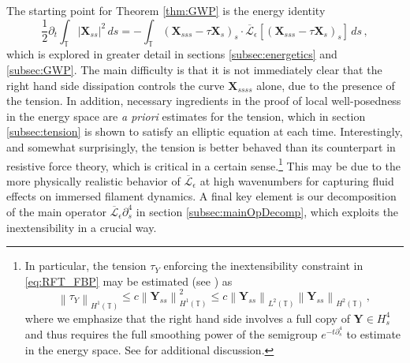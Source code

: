 \documentclass[11pt,reqno]{amsart}
\newcommand{\T}{\mathbb{T}}
\newcommand{\X}{\bm{X}}
\newcommand{\Y}{\bm{Y}}
\newcommand{\p}{\partial}
\newcommand{\abs}[1]{\left\lvert #1 \right\rvert}
\newcommand{\norm}[1]{\left\lVert #1 \right\rVert}
\newcommand{\mc}[1]{\mathcal{#1}}
\numberwithin{equation}{section}
\theoremstyle{definition}
\begin{document}
The starting point for Theorem \ref{thm:GWP} is the energy identity 
\begin{equation}\label{eq:energy0}
\frac{1}{2}\p_t\int_\T \abs{\X_{ss}}^2\,ds = -\int_{\T}(\X_{sss}-\tau\X_s)_s\cdot\overline{\mc{L}}_\epsilon[(\X_{sss}-\tau\X_s)_s]\,ds\,,
\end{equation}
which is explored in greater detail in sections \ref{subsec:energetics} and \ref{subsec:GWP}. The main difficulty is that it is not immediately clear that the right hand side dissipation controls the curve $\X_{ssss}$ alone, due to the presence of the tension. In addition, necessary ingredients in the proof of local well-posedness in the energy space are \emph{a priori} estimates for the tension, which in section \ref{subsec:tension} is shown to satisfy an elliptic equation at each time. Interestingly, and somewhat surprisingly, the tension is better behaved than its counterpart in resistive force theory, which is critical in a certain sense.\footnote{In particular, the tension $\tau_Y$ enforcing the inextensibility constraint in \eqref{eq:RFT_FBP} may be estimated (see \cite[Lemma 3.3]{albritton2025rods}) as
\begin{equation}\label{eq:RFTtension1}
  \norm{\tau_Y}_{H^1(\T)} \le c\norm{\Y_{ss}}_{H^1(\T)}^2\le c\norm{\Y_{ss}}_{L^2(\T)}\norm{\Y_{ss}}_{H^2(\T)}\,,
\end{equation}
where we emphasize that the right hand side involves a full copy of $\Y\in H^4_s$ and thus requires the full smoothing power of the semigroup $e^{-t\p_s^4}$ to estimate in the energy space. See \cite[Remark 2.4]{mori2023well} for additional discussion.} This may be due to the more physically realistic behavior of $\overline{\mc{L}}_\epsilon$ at high wavenumbers for capturing fluid effects on immersed filament dynamics. A final key element is our decomposition of the main operator $\overline{\mc{L}}_\epsilon\p_s^4$ in section \ref{subsec:mainOpDecomp}, which exploits the inextensibility in a crucial way. 
\end{document}
